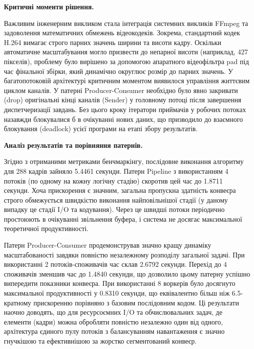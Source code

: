 \documentclass[14pt, a4paper]{extreport}
\begin{document}
	\textbf{Критичні моменти рішення.}
	
	Важливим інженерним викликом стала інтеграція системних викликів FFmpeg та задоволення математичних обмежень відеокодеків. Зокрема, стандартний кодек H.264 вимагає строго парних значень ширини та висоти кадру. Оскільки автоматичне масштабування могло призвести до непарної висоти (наприклад, 427 пікселів), проблему було вирішено за допомогою апаратного відеофільтра pad під час фінальної збірки, який динамічно округлює розмір до парних значень. У багатопотоковій архітектурі критичним моментом виявилося управління життєвим циклом каналів. У патерні Producer-Consumer необхідно було явно закривати (drop) оригінальні кінці каналів (Sender) у головному потоці після завершення диспетчеризації завдань. Без цього кроку ітератори приймачів у робочих потоках назавжди блокувалися б в очікуванні нових даних, що призводило до взаємного блокування (deadlock) усієї програми на етапі збору результатів.
	
	\textbf{Аналіз результатів та порівняння патернів.}
	
	Згідно з отриманими метриками бенчмаркінгу, послідовне виконання алгоритму для 288 кадрів зайняло 5.4461 секунди. Патерн Pipeline з використанням 4 потоків (по одному на кожну логічну стадію) скоротив цей час до 1.8711 секунди. Хоча прискорення є значним, загальна пропускна здатність конвеєра строго обмежується швидкістю виконання найповільнішої стадії (у даному випадку це стадії I/O та кодування). Через це швидші потоки періодично простоюють в очікуванні звільнення буфера, і система не досягає максимальної теоретичної продуктивності.
	
	
	Патерн Producer-Consumer продемонстрував значно кращу динаміку масштабованості завдяки повністю незалежному розподілу загальної задачі. При використанні 2 потоків-споживачів час склав 2.6792 секунди. Перехід до 4 споживачів зменшив час до 1.4840 секунди, що дозволило цьому патерну успішно випередити показники конвеєра. При використанні 8 воркерів було досягнуто максимальної продуктивності у 0.8310 секунди, що еквівалентно більш ніж 6.5-кратному прискоренню порівняно з базовим послідовним кодом. Ці результати наочно доводять, що для ресурсоємних I/O та обчислювальних задач, де елементи (кадри) можна обробляти повністю незалежно один від одного, архітектура єдиного пулу потоків з балансуванням навантаження є значно гнучкішою та ефективнішою за жорстко сегментований конвеєр.
	
	
\end{document}
